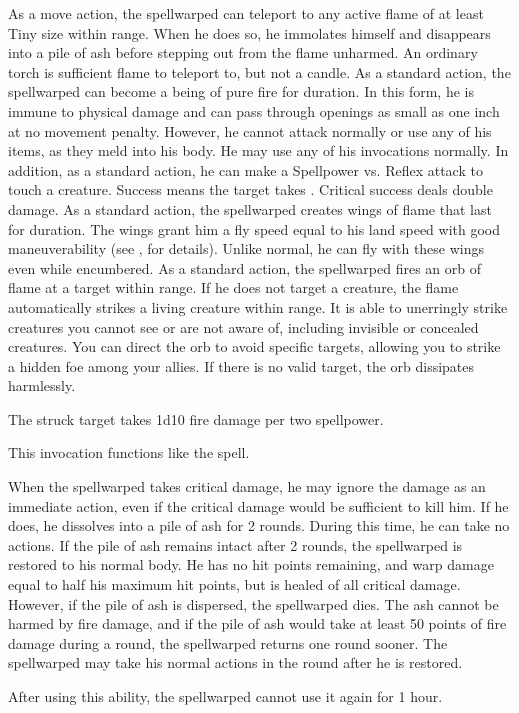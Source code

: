            As a move action, the spellwarped can teleport to any active flame of at least Tiny size within \rngmed range.
            When he does so, he immolates himself and disappears into a pile of ash before stepping out from the flame unharmed.
            An ordinary torch is sufficient flame to teleport to, but not a candle.
            As a standard action, the spellwarped can become a being of pure fire for \durshort duration.
            In this form, he is immune to physical damage and can pass through openings as small as one inch at no movement penalty.
            However, he cannot attack normally or use any of his items, as they meld into his body.
            He may use any of his invocations normally.
            In addition, as a standard action, he can make a Spellpower vs. Reflex attack to touch a creature.
            Success means the target takes .
            Critical success deals double damage.
            As a standard action, the spellwarped creates wings of flame that last for \durshort duration.
            The wings grant him a fly speed equal to his land speed with good maneuverability (see , for details).
            Unlike normal, he can fly with these wings even while encumbered.
            As a standard action, the spellwarped fires an orb of flame at a target within \rnglong range.
            If he does not target a creature, the flame automatically strikes a living creature within range.
            It is able to unerringly strike creatures you cannot see or are not aware of, including invisible or concealed creatures.
            You can direct the orb to avoid specific targets, allowing you to strike a hidden foe among your allies.
            If there is no valid target, the orb dissipates harmlessly.
            \par The struck target takes 1d10 fire damage per two spellpower.

            This invocation functions like the  spell.

            When the spellwarped takes critical damage, he may ignore the damage as an immediate action, even if the critical damage would be sufficient to kill him.
            If he does, he dissolves into a pile of ash for 2 rounds.
            During this time, he can take no actions.
            If the pile of ash remains intact after 2 rounds, the spellwarped is restored to his normal body.
            He has no hit points remaining, and warp damage equal to half his maximum hit points, but is healed of all critical damage.
            However, if the pile of ash is dispersed, the spellwarped dies.
            The ash cannot be harmed by fire damage, and if the pile of ash would take at least 50 points of fire damage during a round, the spellwarped returns one round sooner.
            The spellwarped may take his normal actions in the round after he is restored.
            \par After using this ability, the spellwarped cannot use it again for 1 hour.


